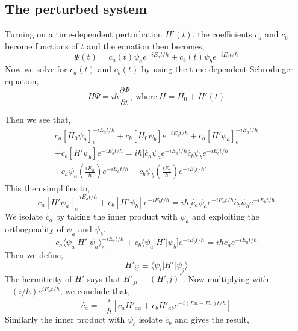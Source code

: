 \subsection{The perturbed system}
Turning on a time-dependent perturbation $H'(t)$, the coefficients $c_a$ and $c_b$ become functions of $t$ and the equation then becomes,
\begin{equation}
	\Psi(t)=c_a(t)\psi_ae^{-iE_at/\hbar}+c_b(t)\psi_be^{-iE_bt/\hbar}
\end{equation} 
Now we solve for $c_a(t)$ and $c_b(t)$ by using the time-dependent Schrodinger equation,
\begin{equation}
	H\Psi=i\hbar\frac{\partial\Psi}{\partial t}, \: \text{where} \: H=H_0+H'(t)
\end{equation}

Then we see that,
\begin{equation}
	\begin{split}
		c_a[H_0\psi_a]_e^{-iE_at/\hbar}+c_b[H_0\psi_b]e^{-iE_bt/\hbar}+c_a[H'\psi_a]_e^{-iE_at/\hbar} \\
		+c_b[H'\psi_b]e^{-iE_bt/\hbar}=i\hbar[ \dot{c_a}\psi_a e^{-iE_at/\hbar}		\dot{c_b}\psi_b e^{-iE_bt/\hbar}\\
		+c_a\psi_a\left(\frac{iE_a}{\hbar}\right)  e^{-iE_at/\hbar}+ c_b\psi_b\left(\frac{iE_b}{\hbar}\right)  e^{-iE_bt/\hbar}]
	\end{split}
\end{equation}
This then simplifies to,
\begin{equation}
	c_a[H'\psi_a]_e^{-iE_at/\hbar}+c_b[H'\psi_b]e^{-iE_bt/\hbar}=i\hbar[ \dot{c_a}\psi_a e^{-iE_at/\hbar}		\dot{c_b}\psi_b e^{-iE_bt/\hbar}
\end{equation}
We isolate $\dot{c_a}$ by taking the inner product with $\psi_a$ and exploiting the orthogonality of $\psi_a$ and $\psi_b$.
\begin{equation}
	c_a\langle \psi_a| H'|\psi_a\rangle_e^{-iE_at/\hbar}+c_b\langle \psi_a|H'|\psi_b]e^{-iE_bt/\hbar}=i\hbar\dot{c_a}e^{-iE_at/\hbar}
\end{equation}
Then we define,
\begin{equation}
	H'_{ij}\equiv\langle\psi_i|H'|\psi_j\rangle
\end{equation}
The hermiticity of $H'$ says that $H'_{ji}=(H'_ij)^*$. Now multiplying with $-(i/\hbar)e^{iE_at/\hbar}$, we conclude that,
\begin{equation}
	\dot{c_a}=-\frac{i}{\hbar}[c_aH'_{aa}+c_bH'_{ab}e^{-i(En-E_a)t/\hbar}]
\end{equation}
Similarly the inner product with $\psi_b$ isolate $\dot{c_b}$ and gives the result,

